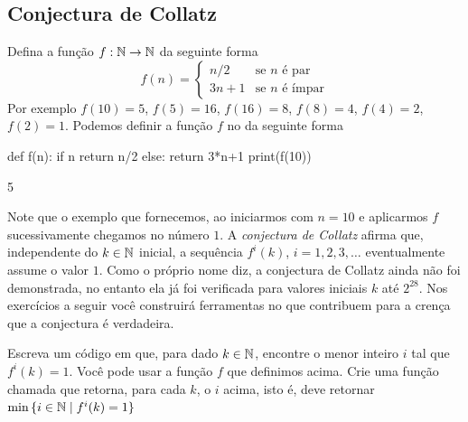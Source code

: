 \subsection{Conjectura de Collatz}
Defina a função $f:\mathbb{N} \to \mathbb{N}$ da seguinte forma
$$
  f(n) = \begin{cases}
    n/2 & \text{se $n$ é par} \\
    3n+1 & \text{se $n$ é ímpar}
  \end{cases}
$$
Por exemplo $f(10) = 5$, $f(5) = 16$, $f(16) = 8$, 
$f(8) = 4$, $f(4) = 2$, $f(2) = 1$. Podemos
definir a função $f$ no \Sage da seguinte forma
\begin{sageinput}
def f(n):
  if n %
    return n/2
  else:
    return 3*n+1
print(f(10))
\end{sageinput}
\begin{sageoutput}
5
\end{sageoutput}
Note que o exemplo que fornecemos, ao iniciarmos com $n = 10$
e aplicarmos $f$ sucessivamente chegamos no número $1$.
A \emph{conjectura de Collatz}
afirma que, independente do $k \in \mathbb{N}$ inicial, a sequência
$f^i(k)$, $i = 1, 2, 3, \dots$ eventualmente assume o valor $1$.
Como o próprio nome diz, a conjectura de Collatz ainda não
foi demonstrada, no entanto ela já foi verificada para
valores iniciais $k$ até $2^{28}$. Nos exercícios a seguir
você construirá ferramentas no \Sage que contribuem para
a crença que a conjectura é verdadeira.

\begin{exercise}
  Escreva um código em \Sage que, para dado $k \in \mathbb{N}$, encontre
  o menor inteiro $i$ tal que $f^i(k) = 1$. Você pode
  usar a função $f$ que definimos acima.
  Crie uma função chamada  que retorna, para
  cada $k$, o $i$ acima, isto é, 
  deve retornar
  ${\min\,\{i \in \mathbb{N} \mid f^i(k) = 1\}}$
\end{exercise}

